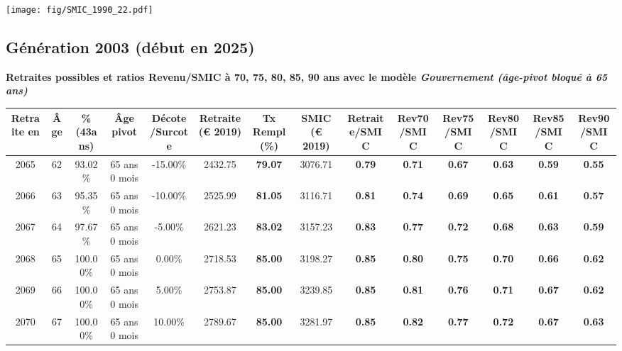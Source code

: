  \vspace{0.1cm} 

 \begin{center}\texttt{[image: fig/SMIC\_1990\_22.pdf]}\end{center} \label{fig/SMIC_1990_22.pdf} 

\newpage 
 
\subsection{Génération 2003 (début en 2025)} 

{\bf \noindent Retraites possibles et ratios Revenu/SMIC à 70, 75, 80, 85, 90 ans avec le modèle \emph{Gouvernement (âge-pivot bloqué à 65 ans)}}  
 
\begin{adjustbox}{max width=\textwidth} 
\begin{tabular}[htb]{|c|c||c|c|c||c|c||c||c|c|c|c|c|c|} 
\hline 
 Retraite en &  Âge &  \%(43ans) &  Âge pivot &  Décote/Surcote &  Retraite (\euro{} 2019) &  Tx Rempl(\%) &  SMIC (\euro{} 2019) &  Retraite/SMIC &  Rev70/SMIC &  Rev75/SMIC &  Rev80/SMIC &  Rev85/SMIC &  Rev90/SMIC \\ 
\hline \hline 
 2065 &  62 &  93.02\% &  65 ans 0 mois &  -15.00\% &  2432.75 &  {\bf 79.07} &  3076.71 &  {\bf {\color{red} 0.79}} &  {\bf {\color{red} 0.71}} &  {\bf {\color{red} 0.67}} &  {\bf {\color{red} 0.63}} &  {\bf {\color{red} 0.59}} &  {\bf {\color{red} 0.55}} \\ 
\hline 
 2066 &  63 &  95.35\% &  65 ans 0 mois &  -10.00\% &  2525.99 &  {\bf 81.05} &  3116.71 &  {\bf {\color{red} 0.81}} &  {\bf {\color{red} 0.74}} &  {\bf {\color{red} 0.69}} &  {\bf {\color{red} 0.65}} &  {\bf {\color{red} 0.61}} &  {\bf {\color{red} 0.57}} \\ 
\hline 
 2067 &  64 &  97.67\% &  65 ans 0 mois &  -5.00\% &  2621.23 &  {\bf 83.02} &  3157.23 &  {\bf {\color{red} 0.83}} &  {\bf {\color{red} 0.77}} &  {\bf {\color{red} 0.72}} &  {\bf {\color{red} 0.68}} &  {\bf {\color{red} 0.63}} &  {\bf {\color{red} 0.59}} \\ 
\hline 
 2068 &  65 &  100.00\% &  65 ans 0 mois &  0.00\% &  2718.53 &  {\bf 85.00} &  3198.27 &  {\bf {\color{red} 0.85}} &  {\bf {\color{red} 0.80}} &  {\bf {\color{red} 0.75}} &  {\bf {\color{red} 0.70}} &  {\bf {\color{red} 0.66}} &  {\bf {\color{red} 0.62}} \\ 
\hline 
 2069 &  66 &  100.00\% &  65 ans 0 mois &  5.00\% &  2753.87 &  {\bf 85.00} &  3239.85 &  {\bf {\color{red} 0.85}} &  {\bf {\color{red} 0.81}} &  {\bf {\color{red} 0.76}} &  {\bf {\color{red} 0.71}} &  {\bf {\color{red} 0.67}} &  {\bf {\color{red} 0.62}} \\ 
\hline 
 2070 &  67 &  100.00\% &  65 ans 0 mois &  10.00\% &  2789.67 &  {\bf 85.00} &  3281.97 &  {\bf {\color{red} 0.85}} &  {\bf {\color{red} 0.82}} &  {\bf {\color{red} 0.77}} &  {\bf {\color{red} 0.72}} &  {\bf {\color{red} 0.67}} &  {\bf {\color{red} 0.63}} \\ 
\hline 
\hline 
\end{tabular} 
\end{adjustbox} 
 
